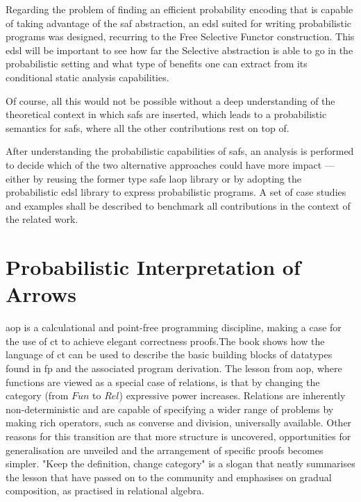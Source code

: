 \documentclass[
  oneside,
  11pt, a4paper,
  footinclude=true,
  headinclude=true,
  cleardoublepage=empty
]{scrbook}
\theoremstyle{definition}
\theoremstyle{definition}
\begin{document}
	Regarding the problem of finding an efficient probability encoding that is capable of taking advantage of the \gls{saf} abstraction, an \gls{edsl} suited for writing probabilistic programs was designed, recurring to the Free Selective Functor construction. This \gls{edsl} will be important to see how far the Selective abstraction is able to go in the probabilistic setting and what type of benefits one can extract from its conditional static analysis capabilities.
	
	Of course, all this would not be possible without a deep understanding of the theoretical context in which \glspl{saf} are inserted, which leads to a probabilistic semantics for \glspl{saf}, where all the other contributions rest on top of.
	
	After understanding the probabilistic capabilities of \glspl{saf}, an analysis is performed to decide which of the two alternative approaches could have more impact --- either by reusing the former type safe \gls{laop} library or by adopting the probabilistic \gls{edsl} library to express probabilistic programs. A set of case studies and examples shall be described to benchmark all contributions in the context of the related work.
	
	    \section{Probabilistic Interpretation of Arrows}
	    
	        \gls{aop} \citep{Bird:1997:AP:248932} is a calculational and point-free programming discipline, making a case for the use of \gls{ct} to achieve elegant correctness proofs.The book %
	        shows how the language of \gls{ct} can be used to describe the basic building blocks of datatypes found in \gls{fp} and the associated program derivation. The lesson from \gls{aop}, where functions are viewed as a special case of relations, is that by changing the category (from $Fun$ to $Rel$) expressive power increases. Relations are inherently non-deterministic and are capable of specifying a wider range of problems by making rich operators, such as converse and division, universally available. Other reasons for this transition are that more structure is uncovered, opportunities for generalisation are unveiled and the arrangement of specific proofs becomes simpler. "Keep the definition, change category" is a slogan that neatly summarises the lesson that \cite{Bird:1997:AP:248932} have passed on to the community and emphasises on gradual composition, as practised in relational algebra.
	        
\end{document}
